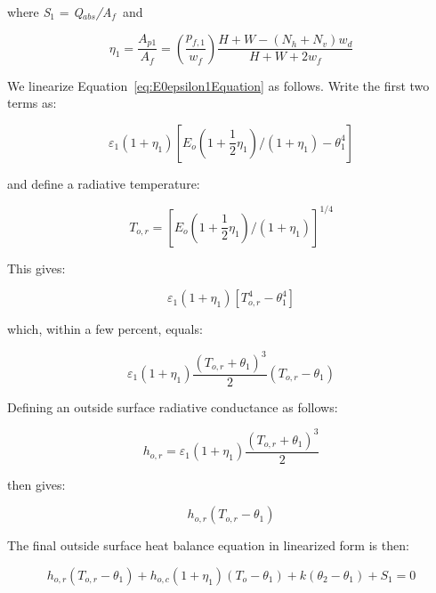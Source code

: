 where \emph{S\(_{1}\)} = \emph{Q\(_{abs}\)/A\(_{f}\)}~and

\begin{equation}
{\eta_1} = \frac{{{A_{p1}}}}{{{A_f}}} = \left( {\frac{{{p_{f,1}}}}{{{w_f}}}} \right)\frac{{H + W - ({N_h} + {N_v}){w_d}}}{{H + W + 2{w_f}}}
\end{equation}

We linearize Equation~\ref{eq:E0epsilon1Equation} as follows.  Write the first two terms as:

\begin{equation}
{\varepsilon_1}(1 + {\eta_1})[{E_o}(1 + \frac{1}{2}{\eta_1})/(1 + {\eta_1}) - \theta_1^4]
\end{equation}

and define a radiative temperature:

\begin{equation}
{T_{o,r}} = {[{E_o}(1 + \frac{1}{2}{\eta_1})/(1 + {\eta_1})]^{1/4}}
\end{equation}

This gives:

\begin{equation}
{\varepsilon_1}(1 + {\eta_1})[T_{o,r}^4 - \theta_1^4]
\end{equation}

which, within a few percent, equals:

\begin{equation}
{\varepsilon_1}(1 + {\eta_1})\frac{{{{({T_{o,r}} + {\theta_1})}^3}}}{2}({T_{o,r}} - {\theta_1})
\end{equation}

Defining an outside surface radiative conductance as follows:

\begin{equation}
{h_{o,r}} = {\varepsilon_1}(1 + {\eta_1})\frac{{{{({T_{o,r}} + {\theta_1})}^3}}}{2}
\end{equation}

then gives:

\begin{equation}
{h_{o,r}}({T_{o,r}} - {\theta_1})
\end{equation}

The final outside surface heat balance equation in linearized form is then:

\begin{equation}
{h_{o,r}}({T_{o,r}} - {\theta_1}) + {h_{o,c}}(1 + {\eta_1})({T_o} - {\theta_1}) + k({\theta_2} - {\theta_1}) + {S_1} = 0
\label{eq:horEquation}
\end{equation}

